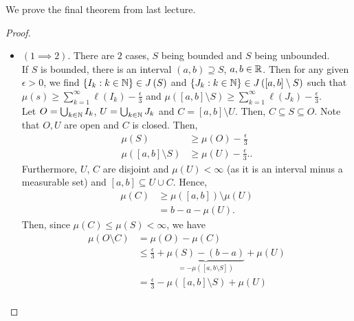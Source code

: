 We prove the final theorem from last lecture.
\begin{proof}
	\begin{itemize}
		\item \(\left( 1 \implies 2 \right) \). There are \(2\) cases, \(S\) being bounded and \(S\) being unbounded.\\
			If \(S\) is bounded, there is an interval \(\left( a, b \right) \supseteq S\), \(a, b \in \mathbb{R}\). Then for any given \(\epsilon > 0\), we find \(\{I_{k} : k \in \mathbb{N}\} \in J\left( S \right)  \) and \(\{J_{k} : k \in \mathbb{N}\}  \in J\left( \left[ a, b \right] \setminus S \right) \) such that \( \mu \left( s \right) \ge \sum_{k=1}^{\infty} \ell\left( I_{k} \right)  - \frac{\epsilon}{3}\) and \( \mu\left( \left[ a, b \right] \setminus S \right)  \ge \sum_{k=1}^{\infty} \ell \left( J_{k} \right) - \frac{\epsilon}{3}\).\\
			Let \(O = \bigcup_{k \in \mathbb{N}} I_{k}\), \(U = \bigcup_{k \in \mathbb{N}} J_{k} \) and \(C = \left[ a, b \right] \setminus U\). Then, \(C  \subseteq S \subseteq O\). Note that \(O, U\) are open and \(C\) is closed. Then, \begin{align*}
				\mu \left( S \right) &\ge \mu\left( O \right) -\frac{\epsilon}{3}\\
				\mu\left( \left[ a, b \right] \setminus S \right) &\ge \mu\left( U \right) - \frac{\epsilon}{3}.
			.
		\end{align*}
		Furthermore, \(U\), \(C\) are disjoint and \(\mu\left( U \right) < \infty\) (as it is an interval minus a measurable set) and \(\left[ a, b \right] \subseteq U \cup C\). Hence,
		\begin{align*}
			\mu\left( C \right) &\ge \mu \left( \left[ a, b \right]  \right)  \setminus \mu \left( U \right) \\
					    &= b - a - \mu\left( U \right)
		.\end{align*}
		Then, since \( \mu\left( C \right) \le \mu\left( S \right)  < \infty\), we have \begin{align*}
			\mu\left( O \setminus C \right) &=  \mu\left( O \right) - \mu\left( C \right)  \\
							&\le \frac{\epsilon}{3} + \underbrace{\mu\left( S \right) - \left( b - a \right)}_{= -\mu\left( \left[ a, b \setminus S \right]  \right) }  + \mu \left( U \right) \\
							&=  \frac{\epsilon}{3}- \mu\left( \left[ a, b \right] \setminus S \right)  + \mu\left( U \right)  \\

\end{align*}
\end{itemize}
\end{proof}
